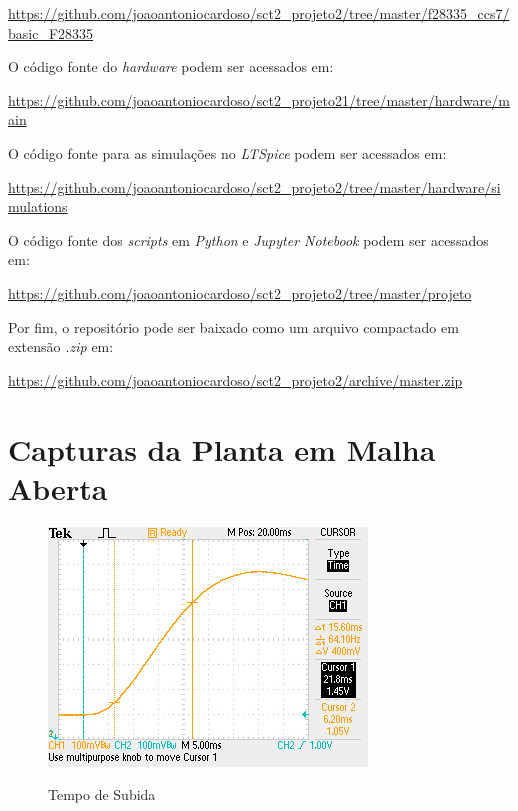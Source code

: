 \documentclass[
	12pt,				%
	article,			%
	openright,			%
	oneside,
	a4paper,			%
	chapter=TITLE,		%
	section=TITLE,		%
	english,			%
	french,				%
	spanish,			%
	brazil,				%
]{abntex2}
\begin{document}
\begin{apendicesenv}
            \url{https://github.com/joaoantoniocardoso/sct2_projeto2/tree/master/f28335_ccs7/basic_F28335}
            
            O código fonte do \textit{hardware} podem ser acessados em:
            
            \url{https://github.com/joaoantoniocardoso/sct2_projeto21/tree/master/hardware/main}
            
            O código fonte para as simulações no \textit{LTSpice} podem ser acessados em:
            
            \url{https://github.com/joaoantoniocardoso/sct2_projeto2/tree/master/hardware/simulations}
            
            O código fonte dos \textit{scripts} em \textit{Python} e \textit{Jupyter Notebook} podem ser acessados em:
            
            \url{https://github.com/joaoantoniocardoso/sct2_projeto2/tree/master/projeto}
            
            Por fim, o repositório pode ser baixado como um arquivo compactado em extensão \textit{.zip} em:
            
            \url{https://github.com/joaoantoniocardoso/sct2_projeto2/archive/master.zip}
            
        \clearpage
	
        \chapter{Capturas da Planta em Malha Aberta}
        	\label{ap-ftma}
        	
        	\FloatBarrier
        	\begin{figure}[htbp]
            	\centering
            	\caption{Tempo de Subida}
            	\includegraphics[width=\textwidth,height=240px,keepaspectratio]{imgs/ftma/rise_time.JPG}
            	\label{fig-ftma-rise_time}
        	\end{figure}			
        

\end{apendicesenv}
\end{document}
